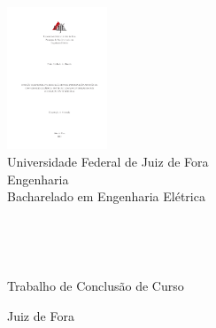 \thispagestyle{empty}
\begin{center}

\includegraphics[width=3.0cm]{./logos/ufjf_logo}\\
\medskip
Universidade Federal de  Juiz de Fora\\
Engenharia\\
Bacharelado em Engenharia Elétrica

\vfill

\Autor\\

\vfill


\TITULO\\

\vfill

Trabalho de Conclusão de Curso\\

\vfill

Juiz de Fora\\
\Ano\\

\end{center}
\newpage
